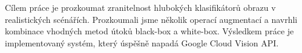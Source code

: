 \documentclass[12pt]{report}
\begin{document}
Cílem práce je prozkoumat zranitelnost hlubokých klasifikátorů obrazu v realistických scénářích. Prozkoumali jsme několik operací augmentací a navrhli kombinace vhodných metod útoků black-box a white-box. Výsledkem práce je implementovaný systém, který úspěšně napadá Google Cloud Vision API.

\end{document}
